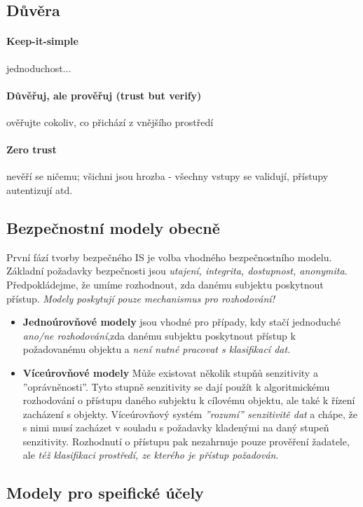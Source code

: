 \documentclass[10pt,a4paper]{article}
\begin{document}
\subsection*{Důvěra}

\paragraph*{Keep-it-simple} jednoduchost...
\paragraph*{Důvěřuj, ale prověřuj (trust but verify)} ověřujte cokoliv, co přichází z vnějšího prostředí 
\paragraph*{Zero trust} nevěří se ničemu; všichni jsou hrozba - všechny vstupy se validují, přístupy autentizují atd.

\subsection*{Bezpečnostní modely obecně}

První fází tvorby bezpečného IS je volba vhodného bezpečnostního modelu. 
Základní požadavky bezpečnosti jsou \textit{utajení, integrita, dostupnost, anonymita}.
Předpokládejme, že umíme rozhodnout, zda danému subjektu poskytnout přístup. 
\textit{Modely poskytují pouze mechanismus pro rozhodování!}
\begin{itemize}
    \item \textbf{Jednoúrovňové modely} jsou vhodné pro případy, kdy stačí jednoduché \textit{ano/ne rozhodování},zda danému subjektu poskytnout přístup k požadovanému objektu a \textit{není nutné pracovat s klasifikací dat}.
    \item \textbf{Víceúrovňové modely} Může existovat několik stupňů senzitivity a ”oprávněnosti”.
    Tyto stupně senzitivity se dají použít k algoritmickému rozhodování o přístupu daného
    subjektu k cílovému objektu, ale také k řízení zacházení s objekty. Víceúrovňový systém
    \textit{”rozumí” senzitivitě dat} a chápe, že s nimi musí zacházet v souladu s požadavky
    kladenými na daný stupeň senzitivity. Rozhodnutí o přístupu pak nezahrnuje pouze
    prověření žadatele, ale \textit{též klasifikaci prostředí, ze kterého je přístup požadován}.
\end{itemize}

\subsection*{Modely pro speifické účely}
\end{document}
